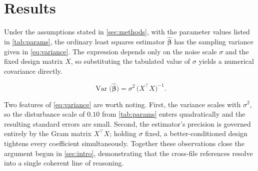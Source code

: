 \section{Results}
\label{sec:results}

Under the assumptions stated in \cref{sec:methods}, with the parameter values
listed in \cref{tab:params}, the ordinary least squares estimator
$\hat{\boldsymbol{\beta}}$ has the sampling variance given in \cref{eq:variance}.
The expression depends only on the noise scale $\sigma$ and the fixed design
matrix $X$, so substituting the tabulated value of $\sigma$ yields a numerical
covariance directly.

\begin{equation}
\label{eq:variance}
\operatorname{Var}\bigl(\hat{\boldsymbol{\beta}}\bigr)
  = \sigma^{2}\,\bigl(X^{\top} X\bigr)^{-1}.
\end{equation}

Two features of \cref{eq:variance} are worth noting. First, the variance scales
with $\sigma^{2}$, so the disturbance scale of $0.10$ from \cref{tab:params}
enters quadratically and the resulting standard errors are small. Second, the
estimator's precision is governed entirely by the Gram matrix $X^{\top} X$;
holding $\sigma$ fixed, a better-conditioned design tightens every coefficient
simultaneously. Together these observations close the argument begun in
\cref{sec:intro}, demonstrating that the cross-file references resolve into a
single coherent line of reasoning.
